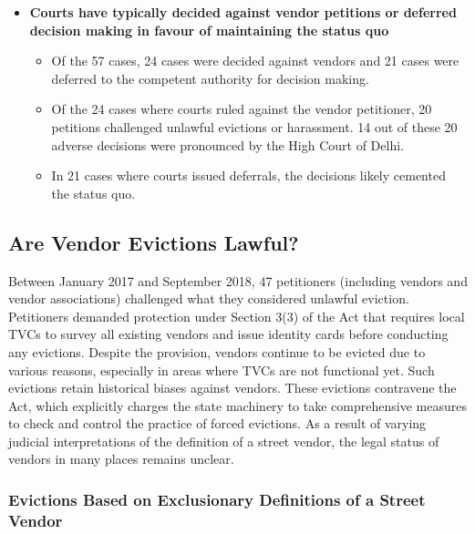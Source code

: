 \documentclass[a4paper, 12pt, twoside]{article}
\begin{document}
{\begin{itemize}
\begin{itemize}
\end{itemize}

\end{itemize}

\begin{itemize}
\item \textbf{ Courts have typically decided against vendor petitions or deferred decision making in favour of maintaining the status quo}

\begin{itemize}
\item Of the 57 cases, 24 cases were decided against vendors and 21 cases were deferred to the competent authority for decision making.
\item Of the 24 cases where courts ruled against the vendor petitioner, 20 petitions challenged unlawful evictions or harassment. 14 out of these 20 adverse decisions were pronounced by the High Court of Delhi.
\item In 21 cases where courts issued deferrals, the decisions likely cemented the status quo.
\end{itemize}
\end{itemize}

\subsection*{Are Vendor Evictions Lawful?}

Between January 2017 and September 2018, 47 petitioners (including vendors and vendor associations) challenged what they considered unlawful eviction. Petitioners demanded protection under Section 3(3) of the Act that requires local TVCs to survey all existing vendors and issue identity cards before conducting any evictions. Despite the provision, vendors continue to be evicted due to various reasons, especially in areas where TVCs are not functional yet. Such evictions retain historical biases against vendors. These evictions contravene the Act, which explicitly charges the state machinery to take comprehensive measures to check and control the practice of forced evictions. As a result of varying judicial interpretations of the definition of a street vendor, the legal status of vendors in many places remains unclear.

\subsubsection*{Evictions Based on Exclusionary Definitions of a Street Vendor}

}
\end{document}
